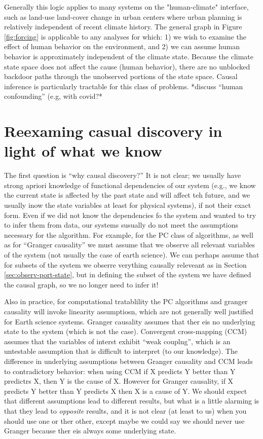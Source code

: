 \documentclass[12pt]{article}
\begin{document}
Generally this logic applies to many systems on the "human-climate"
interface, such as land-use land-cover change in urban centers where
urban planning is relatively independent of recent climate
history. The general graph in Figure \ref{fig:forcing} is applicable
to any analyses for which: 1) we wish to examine the effect of human
behavior on the environment, and 2) we can assume human behavior is
approximately independent of the climate state. Because the climate
state space does not affect the cause (human behavior), there are no
unblocked backdoor paths through the unobserved portions of the state
space. Causal inference is particularly tractable for this class of
problems. *discuss ``human confounding'' (e.g, with covid?*

\section{Reexaming casual discovery in light of what we know}
\label{sec:discovery}

The first question is ``why causal discovery?'' It is not clear; we
usually have strong apriori knowledge of functional dependencies of
our system (e.g., we know the current state is affected by the past
state and will affect teh future, and we usually inow the state
variables at least for physical systems), if not their exact
form. Even if we did not know the dependencies fo the system and
wanted to try to infer them from data, our systems susually do not
meet the assumptions necessary for the algorithm. For example, for the
PC class of algorithms, as well as for ``Granger causality'' we must
assume that we observe all relevant variables of the system (not
usually the case of earth science). We can perhaps assume that for
subsets of the system we obserre verything causally releveant as in
Section \ref{sec:observ-port-state}, but in defining the subset of the
system we have defined the causal graph, so we no longer need to infer it!

Also in practice, for computational tratablility the PC algorithms and
granger causality will invoke linearity assumptiosn, which are not
generally well justified for Earth science systems. Granger causality
assumes that ther eis no underlying state to the system (which is not
the case). Convergent cross-mapping (CCM) \citep{Sugihara496} assumes
that the variables of interst exhibit ``weak couplng'', which is an
untestable assumption that is difficult to interpret (to our
knowledge). The difference in underlying assumptions between Granger
causality and CCM leads to contradictory behavior: when using CCM if X
predicts Y better than Y predictrs X, then Y is the cause of
X. However for Granger causality, if X predicts Y better than Y
predicts X then X is a cause of Y. We should expect that different
assumptions lead to different results, but what is a little alarming
is that they lead to \textit{opposite} results, and it is not clear
(at least to us) when you should use one or ther other, except maybe
we could say we should never use Granger because ther eis always some
underlying state.
\end{document}
